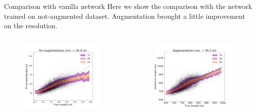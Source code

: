 \documentclass{beamer}
\begin{document}
\begin{frame}{Comparison with vanilla network}
    Here we show the comparison with the network trained on not-augmented dataset.
    Augmentation brought a little improvement on the resolution.
\begin{columns}
    \begin{figure}
        \centering
            \includegraphics[width=0.95\textwidth]{figures/not_aug_scaled.png}
    \end{figure}
    \begin{figure}
        \centering
        \includegraphics[width=0.97\textwidth]{figures/aug_scaled.png}
    \end{figure}

\end{columns}
\end{frame}
\end{document}
